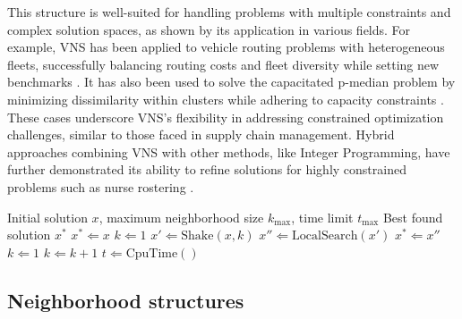\documentclass[sn-nature]{sn-jnl}%
\theoremstyle{thmstyleone}%
\theoremstyle{thmstyletwo}%
\theoremstyle{thmstylethree}%
\begin{document}
This structure is well-suited for handling problems with multiple constraints and complex solution spaces, as shown by its application in various fields. 
For example, VNS has been applied to vehicle routing problems with heterogeneous fleets, successfully balancing routing costs and fleet diversity while 
setting new benchmarks \cite{imran2009variable}. It has also been used to solve the capacitated p-median problem by minimizing dissimilarity within 
clusters while adhering to capacity constraints \cite{fleszar2008effective}. These cases underscore VNS's flexibility in addressing constrained 
optimization challenges, similar to those faced in supply chain management. Hybrid approaches combining VNS with other methods, like Integer Programming, have further demonstrated its ability to refine solutions for 
highly constrained problems such as nurse rostering \cite{burke2010hybrid}.


\begin{algorithm}
    \caption{Variable Neighborhood Search (VNS)}\label{algoVNS}
    \begin{algorithmic}[1]
    \Require Initial solution $x$, maximum neighborhood size $k_{\text{max}}$, time limit $t_{\text{max}}$
    \Ensure Best found solution $x^*$
    \State $x^* \Leftarrow x$
    \Repeat
        \State $k \Leftarrow 1$
        \Repeat
            \State $x' \Leftarrow \text{Shake}(x, k)$ 
            \State $x'' \Leftarrow \text{LocalSearch}(x')$ 
                \State $x^* \Leftarrow x''$
                \State $k \Leftarrow 1$ 
            \Else
                \State $k \Leftarrow k + 1$
            \EndIf
        \State $t \Leftarrow \text{CpuTime}()$
    \end{algorithmic}
\end{algorithm}

\subsection{Neighborhood structures}
\end{document}
